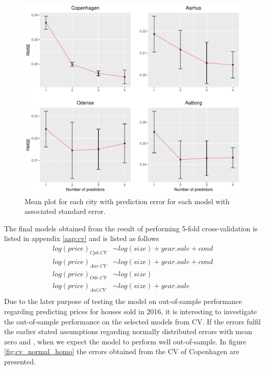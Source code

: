 \begin{figure}[H]
    \centering
  \includegraphics[width = 1 \textwidth]{figures/Nanna/CrossValidationSamlet.pdf}
  \caption{Mean plot for each city with prediction error for each model with associated standard error.}
  \label{fig:CrossValidationSamlet}
\end{figure}

The final models obtained from the result of performing 5-fold cross-validation is listed in appendix \ref{aap:cv} and is listed as follows
\begin{align*}
    log(price)_{Cph.CV} &\sim log(size) + year.sale + cond \\
    log(price)_{Aar.CV} &\sim log(size) + year.sale + cond\\
    log(price)_{Ode.CV} &\sim log(size) \\
    log(price)_{Aal.CV} &\sim log(size) + year.sale \\
\end{align*}
Due to the later purpose of testing the model on out-of-sample performance regarding predicting prices for houses sold in 2016, it is interesting to investigate the out-of-sample performance on the selected models from CV.
If the errors fulfil the earlier stated assumptions regarding normally distributed errors with mean zero and \homo, when we expect the model to perform well out-of-sample. In figure \ref{fig:cv_normal_homo} the errors obtained from the CV of Copenhagen are presented.

